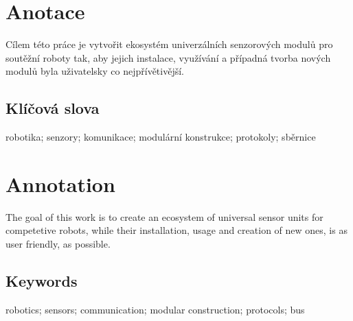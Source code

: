 \documentclass{template/template}
\author{Tomáš Rohlínek}
\begin{document}
\maketitle



\pagestyle{empty}

\section*{Anotace}
Cílem této práce je vytvořit ekosystém univerzálních senzorových modulů pro soutěžní roboty tak, aby jejich instalace, využívání a případná tvorba nových modulů byla uživatelsky co nejpřívětivější.

\subsection*{Klíčová slova}
robotika; senzory; komunikace; modulární konstrukce; protokoly; sběrnice

\vspace{20mm}

\section*{Annotation}
The goal of this work is to create an ecosystem of universal sensor units for competetive robots, while their installation, usage and creation of new ones, is as user friendly, as possible.

\subsection*{Keywords}
robotics; sensors; communication; modular construction; protocols; bus

\newpage
\pagestyle{plain}

\tableofcontents %

\setcounter{figure}{0}
\setcounter{table}{0}
\newpage









\end{document}
